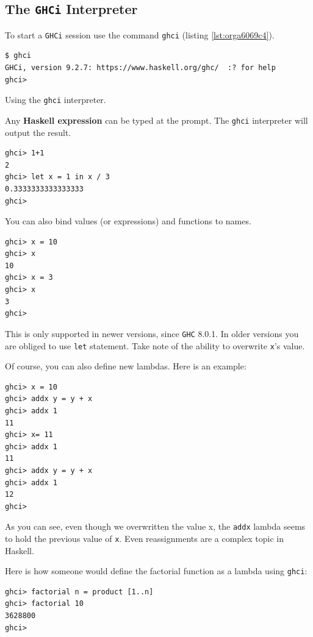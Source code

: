 \documentclass[a4paper, titlepage, twoside]{article}
\begin{document}
\subsection{The \texttt{GHCi} Interpreter}
\label{sec:org9fd9310}

To start a \texttt{GHCi} session use the command \texttt{ghci} (listing \ref{lst:orga6069c4}).

\begin{listing}[H]
\begin{verbatim}
$ ghci
GHCi, version 9.2.7: https://www.haskell.org/ghc/  :? for help
ghci>
\end{verbatim}
\caption{\label{lst:orga6069c4}Using the \texttt{ghci} interpreter.}
\end{listing}

Any \textbf{Haskell expression} can be typed at the prompt. The \texttt{ghci} interpreter will output the result.

\begin{verbatim}
ghci> 1+1
2
ghci> let x = 1 in x / 3
0.3333333333333333
ghci>
\end{verbatim}

You can also bind values (or expressions) and functions to names.

\begin{verbatim}
ghci> x = 10
ghci> x
10
ghci> x = 3
ghci> x
3
ghci>
\end{verbatim}

This is only supported in newer versions, since \texttt{GHC} 8.0.1. In older versions you are obliged to use \texttt{let} statement. Take note of the ability to overwrite \texttt{x}'s value.

Of course, you can also define new lambdas. Here is an example:

\begin{verbatim}
ghci> x = 10
ghci> addx y = y + x
ghci> addx 1
11
ghci> x= 11
ghci> addx 1
11
ghci> addx y = y + x
ghci> addx 1
12
ghci> 
\end{verbatim}

As you can see, even though we overwritten the value x, the \texttt{addx} lambda seems to hold the previous value of \texttt{x}. Even reassignments are a complex topic in Haskell.

Here is how someone would define the factorial function as a lambda using \texttt{ghci}:

\begin{verbatim}
ghci> factorial n = product [1..n]
ghci> factorial 10
3628800
ghci>
\end{verbatim}
\end{document}
